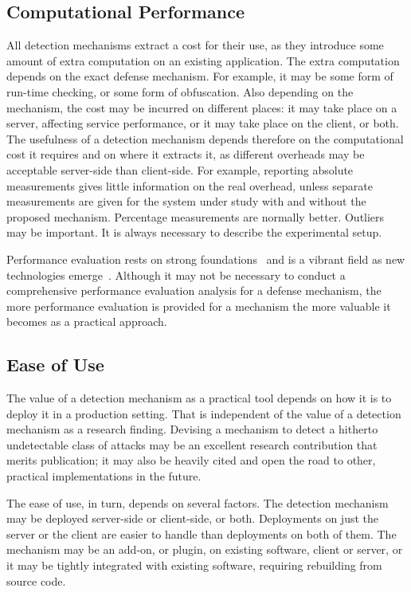\documentclass[conference]{IEEEtran}
\begin{document}
\subsection{Computational Performance}

All detection mechanisms extract a cost for their use, as they
introduce some amount of extra computation on an existing application.
The extra computation depends on the exact defense mechanism. For
example, it may be some form of run-time checking, or some form of
obfuscation. Also depending on the mechanism, the cost may be incurred
on different places: it may take place on a server, affecting service
performance, or it may take place on the client, or both. The
usefulness of a detection mechanism depends therefore on the
computational cost it requires and on where it extracts it, as
different overheads may be acceptable server-side than client-side.
For example, reporting absolute measurements gives little information
on the real overhead, unless separate measurements are given for the
system under study with and without the proposed mechanism. Percentage
measurements are normally better. Outliers may be important. It is
always necessary to describe the experimental setup.

Performance evaluation rests on strong foundations~\cite{jain1991} and
is a vibrant field as new technologies emerge~\cite{gregg2014}.
Although it may not be necessary to conduct a comprehensive
performance evaluation analysis for a defense mechanism, the more
performance evaluation is provided for a mechanism the more valuable
it becomes as a practical approach.

\subsection{Ease of Use}
\label{sec:deployment}

The value of a detection mechanism as a practical tool depends on how
it is to deploy it in a production setting. That is independent of the
value of a detection mechanism as a research finding. Devising a
mechanism to detect a hitherto undetectable class of attacks may be an
excellent research contribution that merits publication; it may also
be heavily cited and open the road to other, practical
implementations in the future. 

The ease of use, in turn, depends on several factors. The detection
mechanism may be deployed server-side or client-side, or both.
Deployments on just the server or the client are easier to handle than
deployments on both of them. The mechanism may be an add-on, or
plugin, on existing software, client or server, or it may be tightly
integrated with existing software, requiring rebuilding from source
code. 
\end{document}
